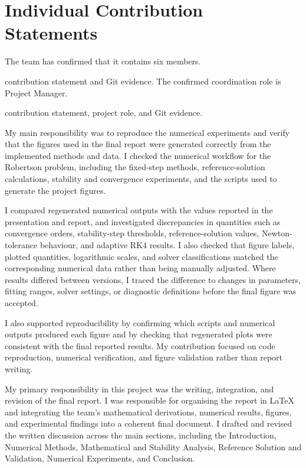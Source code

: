\section{Individual Contribution Statements}
The team has confirmed that it contains six members.

\begin{description}[style=nextline,leftmargin=0pt]
\item[Member 1 -- Chuqiao Tang (2360692), Project Manager:] \pending{} contribution statement and Git evidence. The confirmed coordination role is Project Manager.
\item[Member 2 -- Jinyu Ma (2363433):] \pending{} contribution statement, project role, and Git evidence.
\item[Member 3 -- Muqing Xu (2362900):] My main responsibility was to reproduce the numerical experiments and verify that the figures used in the final report were generated correctly from the implemented methods and data. I checked the numerical workflow for the Robertson problem, including the fixed-step methods, reference-solution calculations, stability and convergence experiments, and the scripts used to generate the project figures.

I compared regenerated numerical outputs with the values reported in the presentation and report, and investigated discrepancies in quantities such as convergence orders, stability-step thresholds, reference-solution values, Newton-tolerance behaviour, and adaptive RK4 results. I also checked that figure labels, plotted quantities, logarithmic scales, and solver classifications matched the corresponding numerical data rather than being manually adjusted. Where results differed between versions, I traced the difference to changes in parameters, fitting ranges, solver settings, or diagnostic definitions before the final figure was accepted.

I also supported reproducibility by confirming which scripts and numerical outputs produced each figure and by checking that regenerated plots were consistent with the final reported results. My contribution focused on code reproduction, numerical verification, and figure validation rather than report writing.
\item[Member 4 -- Shuoran Fu (2362626):]My primary responsibility in this project was the writing, integration, and revision of the final report. I was responsible for organising the report in LaTeX and integrating the team’s mathematical derivations, numerical results, figures, and experimental findings into a coherent final document. I drafted and revised the written discussion across the main sections, including the Introduction, Numerical Methods, Mathematical and Stability Analysis, Reference Solution and Validation, Numerical Experiments, and Conclusion.  


\end{description}
